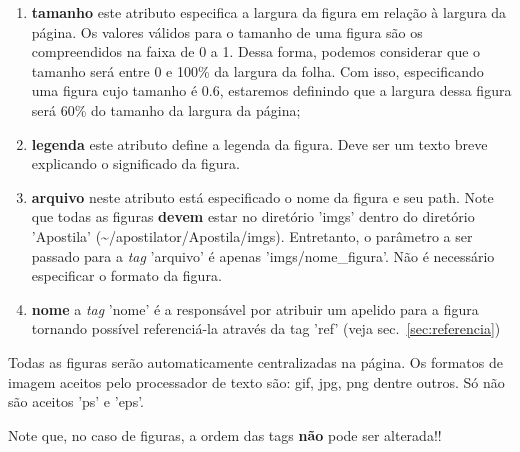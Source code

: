 \begin{enumerate}
	\item{\bf tamanho} este atributo especifica a largura da figura em
	relação à largura da página. Os valores válidos para o tamanho de uma
	figura são os compreendidos na faixa de 0 a 1. Dessa forma, podemos
	considerar que o tamanho será entre 0 e 100\% da largura da folha. 
	Com isso, especificando uma figura cujo tamanho é 0.6, estaremos definindo 
	que a largura dessa figura será 60\% do tamanho da largura da página;

	\item{\bf legenda} este atributo define a legenda da figura. Deve ser um
	texto breve explicando o significado da figura.

	\item{\bf arquivo} neste atributo está especificado o nome da figura e
	seu path. Note que todas as figuras {\bf devem} estar no diretório 'imgs'
	dentro do diretório 'Apostila' (\~{}/apostilator/Apostila/imgs). Entretanto,
	o parâmetro a ser passado para a {\it tag} 'arquivo' é apenas
	'imgs/nome\_figura'. Não é necessário especificar o formato da figura.
	
	\item{\bf nome} a {\it tag} 'nome' é a responsável por atribuir um
	apelido para a figura tornando possível referenciá-la através da tag 'ref'
	(veja sec.~\ref{sec:referencia})

\end{enumerate}

Todas as figuras serão automaticamente centralizadas na página. Os formatos
de imagem aceitos pelo processador de texto são: gif, jpg, png dentre outros.
Só não são aceitos 'ps' e 'eps'.

Note que, no caso de figuras, a ordem das tags {\bf não} pode ser alterada!!
